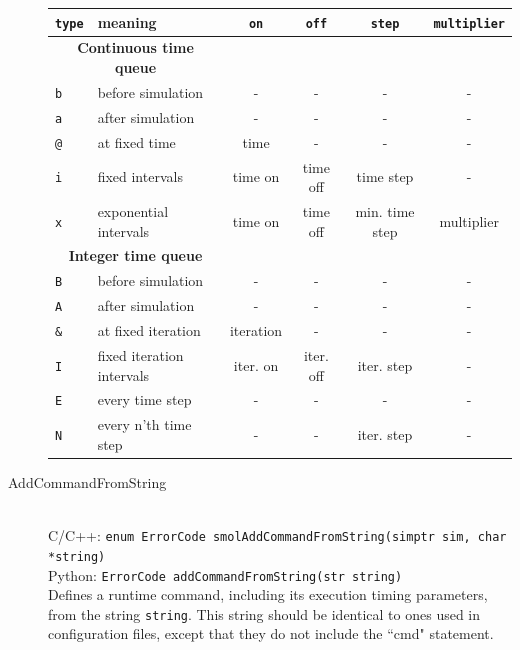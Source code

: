 \documentclass {scrbook}
\newcommand {\ttt} {\texttt}
\begin{document}
\begin{description}
\begin{longtable}[c]{ll|cccc}
\ttt{type} & meaning & \ttt{on} & \ttt{off} & \ttt{step} & \ttt{multiplier}\\
\hline
\multicolumn{2}{c}{\textbf{Continuous time queue}}\\
\ttt{b} & before simulation & - & - & - & -\\
\ttt{a} & after simulation & - & - & - & -\\
\ttt{@} & at fixed time & time & - & - & -\\
\ttt{i} & fixed intervals & time on & time off & time step & -\\
\ttt{x} & exponential intervals & time on & time off & min. time step & multiplier\\
\hline
\multicolumn{2}{c}{\textbf{Integer time queue}}\\
\ttt{B} & before simulation & - & - & - & -\\
\ttt{A} & after simulation & - & - & - & -\\
\ttt{\&} & at fixed iteration & iteration & - & - & -\\
\ttt{I} & fixed iteration intervals & iter. on & iter. off & iter. step & -\\
\ttt{E} & every time step & - & - & - & -\\
\ttt{N} & every n'th time step & - & - & iter. step & -\\
\end{longtable}

\item[AddCommandFromString]
\hfill \\
C/C++: \ttt{enum ErrorCode smolAddCommandFromString(simptr sim, char *string)}\\
Python: \ttt{ErrorCode addCommandFromString(str string)}\\
Defines a runtime command, including its execution timing parameters, from the string \ttt{string}. This string should be identical to ones used in configuration files, except that they do not include the ``cmd" statement.


\end{description}
\end{document}
